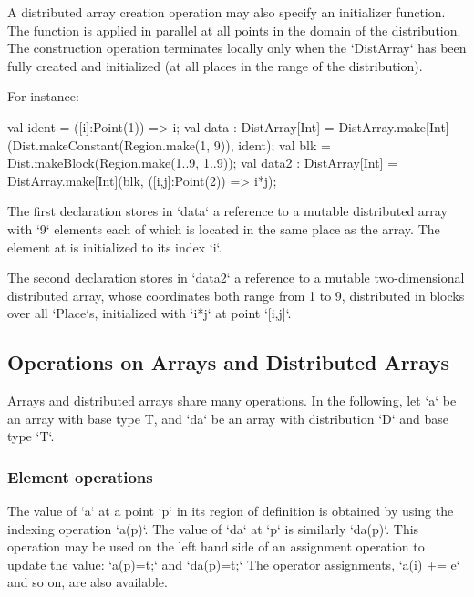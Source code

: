 \begin{ex}A distributed array creation operation may also specify an initializer
function.
The function is applied in parallel
at all points in the domain of the distribution. The
construction operation terminates locally only when the \xcd`DistArray` has been
fully created and initialized (at all places in the range of the
distribution).

For instance:
\begin{xten}
val ident = ([i]:Point(1)) => i;
val data : DistArray[Int]
    = DistArray.make[Int](Dist.makeConstant(Region.make(1, 9)), ident);
val blk = Dist.makeBlock(Region.make(1..9, 1..9));
val data2 : DistArray[Int]
    = DistArray.make[Int](blk, ([i,j]:Point(2)) => i*j);
\end{xten}




{}\noindent 
The first declaration stores in \xcd`data` a reference to a mutable
distributed array with \xcd`9` elements each of which is located in the
same place as the array. The element at \Xcd{[i]} is initialized to its index
\xcd`i`. 

The second declaration stores in \xcd`data2` a reference to a mutable
two-dimensional distributed array, whose coordinates both range from 1 to
9, distributed in blocks over all \xcd`Place`s, 
initialized with \xcd`i*j`
at point \xcd`[i,j]`.
\end{ex}


\subsection{Operations on Arrays and Distributed Arrays}

Arrays and distributed arrays share many operations.
In the following, let \xcd`a` be an array with base type T, and \xcd`da` be an
array with distribution \xcd`D` and base type \xcd`T`.




\subsubsection{Element operations}
The value of \xcd`a` at a point \xcd`p` in its region of definition is
obtained by using the indexing operation \xcd`a(p)`. 
The value of \xcd`da` at \xcd`p` is similarly
\xcd`da(p)`.
This operation
may be used on the left hand side of an assignment operation to update
the value: 
\xcd`a(p)=t;`
and 
\xcd`da(p)=t;`
The operator assignments, \xcd`a(i) += e` and so on,  are also
available. 

